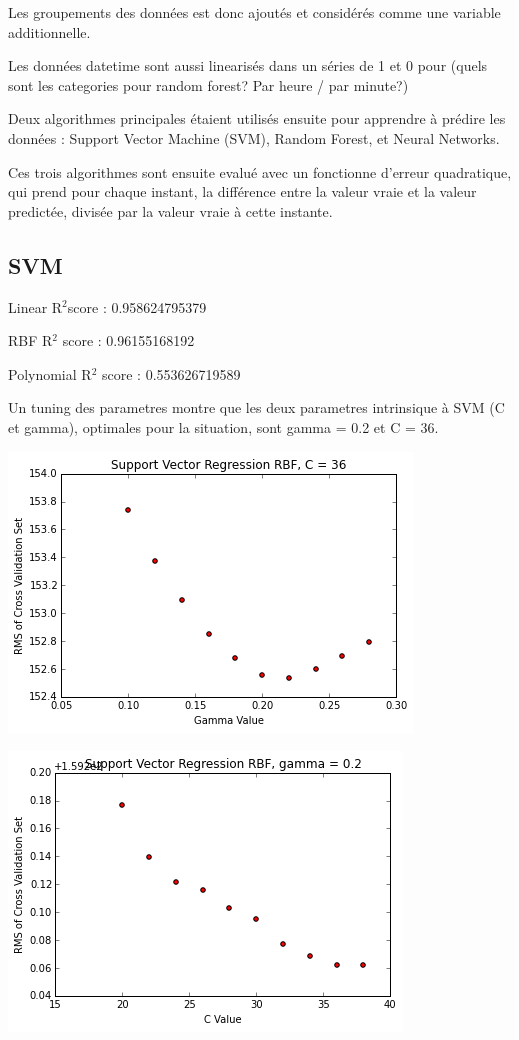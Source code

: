 \documentclass[a4paper]{article}
\begin{document}
\begin{multicols}{2}
Les groupements des données est donc ajoutés et considérés comme une variable additionnelle. 

Les données datetime sont aussi linearisés dans un séries de 1 et 0 pour (quels sont les categories pour random forest? Par heure / par minute?)

Deux algorithmes principales étaient utilisés ensuite pour apprendre à prédire les données : Support Vector Machine (SVM), Random Forest, et Neural Networks.

Ces trois algorithmes sont ensuite evalué avec un fonctionne d'erreur quadratique, qui prend pour chaque instant, la différence entre la valeur vraie et la valeur predictée, divisée par la valeur vraie à cette instante. 

\subsection{SVM}
Linear R$^{2} $score : 0.958624795379

RBF R$^{2}$ score : 0.96155168192

Polynomial R$^{2}$ score : 0.553626719589

Un tuning des parametres montre que les deux parametres intrinsique à SVM (C et gamma), optimales pour la situation, sont gamma = 0.2 et C = 36. 

\includegraphics[width=\textwidth/2]{./svmselectgamma.png}

\includegraphics[width=\textwidth/2]{./svmselectc.png}


\end{multicols}
\end{document}
